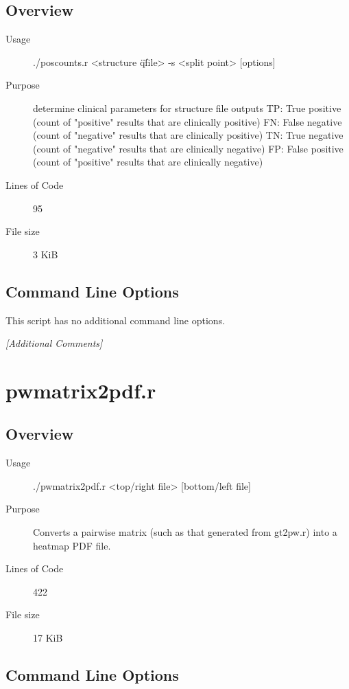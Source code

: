 \subsection{Overview}
\label{sec:poscounts.r-overview}

\begin{description}
\item[Usage] ./poscounts.r <structure \"q\" file> -s <split point> [options]
\item[Purpose] determine clinical parameters for structure file outputs TP: True positive (count of "positive" results that are clinically positive) FN: False negative (count of "negative" results that are clinically positive) TN: True negative (count of "negative" results that are clinically negative) FP: False positive (count of "positive" results that are clinically negative)
\item[Lines of Code] 95
\item[File size] 3 KiB
\end{description}

\subsection{Command Line Options}
\label{sec:poscounts.r-command-line}

This script has no additional command line options.

\emph{[Additional Comments]}

\section{pwmatrix2pdf.r}
\label{sec:pwmatrix2pdf.r}

\subsection{Overview}
\label{sec:pwmatrix2pdf.r-overview}

\begin{description}
\item[Usage] ./pwmatrix2pdf.r <top/right file> [bottom/left file]
\item[Purpose] Converts a pairwise matrix (such as that generated from gt2pw.r) into a heatmap PDF file.
\item[Lines of Code] 422
\item[File size] 17 KiB
\end{description}

\subsection{Command Line Options}
\label{sec:pwmatrix2pdf.r-command-line}

